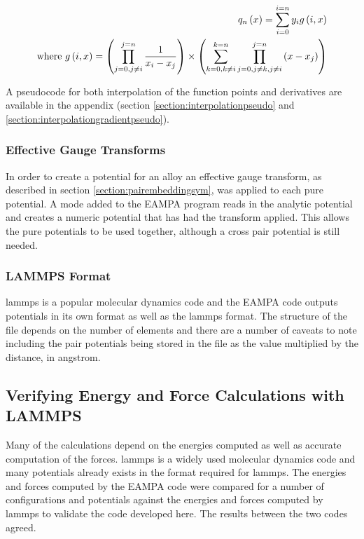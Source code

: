\begin{equation}
\begin{split}
q_n \left( x \right) = \sum_{i=0}^{i=n} y_{i} g \left(i,  x \right) \\
\textnormal{where    } g \left(i, x \right) = \left( \prod_{j=0, j \neq i}^{j=n} \frac{1}{x_i - x_j} \right) \times \left( \sum_{k=0, k \neq i}^{k=n} \prod_{j=0, j \neq k, j \neq i}^{j=n} \left( x - x_j \right) \right)
\end{split}
\label{eq:eqLagrangePolynomialNew}
\end{equation}

A pseudocode for both interpolation of the function points and derivatives are available in the appendix (section \ref{section:interpolationpseudo} and \ref{section:interpolationgradientpseudo}).



\subsubsection{Effective Gauge Transforms}

In order to create a potential for an alloy an effective gauge transform, as described in section \ref{section:pairembeddingsym}, was applied to each pure potential.  A mode added to the EAMPA program reads in the analytic potential and creates a numeric potential that has had the transform applied.  This allows the pure potentials to be used together, although a cross pair potential is still needed.



\subsubsection{LAMMPS Format}

\acrshort{lammps} is a popular molecular dynamics code and the EAMPA code outputs potentials in its own format as well as the \acrshort{lammps} format.  The structure of the file depends on the number of elements and there are a number of caveats to note including the pair potentials being stored in the file as the value multiplied by the distance, in angstrom\cite{lammpseamformat}.




\subsection{Verifying Energy and Force Calculations with LAMMPS}

Many of the calculations depend on the energies computed as well as accurate computation of the forces.  \acrshort{lammps} is a widely used molecular dynamics code and many potentials already exists in the format required for \acrshort{lammps}.  The energies and forces computed by the EAMPA code were compared for a number of configurations and potentials against the energies and forces computed by \acrshort{lammps} to validate the code developed here.  The results between the two codes agreed.



